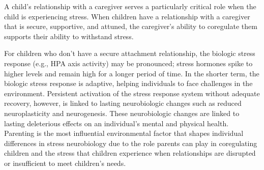 A child’s relationship with a caregiver serves a particularly critical role
when the child is experiencing stress. When children have a relationship with a
caregiver that is secure, supportive, and attuned, the caregiver’s ability to
coregulate them supports their ability to withstand stress.
\cite{Feldman3}

For children who don’t have a secure attachment relationship, the biologic
stress response (e.g., HPA axis activity) may be pronounced; stress hormones
spike to higher levels and remain high for a longer period of time. In the
shorter term, the biologic stress response is adaptive, helping individuals to
face challenges in the environment. Persistent activation of the stress
response system without adequate recovery, however, is linked to lasting
neurobiologic changes such as reduced neuroplasticity and neurogenesis. These
neurobiologic changes are linked to lasting deleterious effects on an
individual’s mental and physical health. Parenting is the most influential
environmental factor that shapes individual differences in stress neurobiology
due to the role parents can play in coregulating children and the stress that
children experience when relationships are disrupted or insufficient to meet
children’s needs. \cite{Feldman3}


